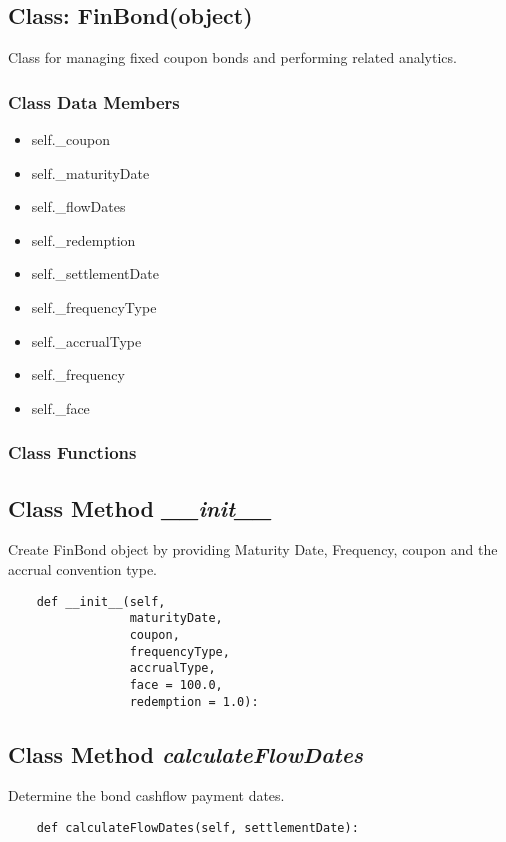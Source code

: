 \documentclass[twoside,11pt]{book}
\begin{document}
\subsection{Class: FinBond(object)}
Class for managing fixed coupon bonds and performing related analytics. 

\subsubsection{Class Data Members}
\begin{itemize}
\item{self.\_coupon}
\item{self.\_maturityDate}
\item{self.\_flowDates}
\item{self.\_redemption}
\item{self.\_settlementDate}
\item{self.\_frequencyType}
\item{self.\_accrualType}
\item{self.\_frequency}
\item{self.\_face}
\end{itemize}

\subsubsection{Class Functions}

\subsection{Class Method {\it \_\_init\_\_}}
Create FinBond object by providing Maturity Date, Frequency, coupon and the accrual convention type. 

\begin{lstlisting}
    def __init__(self, 
                 maturityDate, 
                 coupon, 
                 frequencyType, 
                 accrualType,
                 face = 100.0,
                 redemption = 1.0):
\end{lstlisting}

\subsection{Class Method {\it calculateFlowDates}}
Determine the bond cashflow payment dates. 

\begin{lstlisting}
    def calculateFlowDates(self, settlementDate):
\end{lstlisting}
\end{document}
